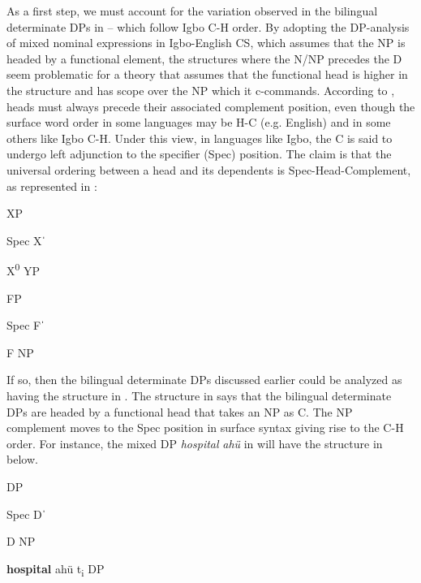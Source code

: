 \documentclass[output=paper]{langsci/langscibook}
\begin{document}
As a first step, we must account for the variation observed in the bilingual determinate DPs in -- which follow Igbo C-H order. By adopting the DP-analysis of mixed nominal expressions in Igbo-English CS, which assumes that the NP is headed by a functional element, the structures where the N/NP precedes the D seem problematic for a theory that assumes that the functional head is higher in the structure and has scope over the NP which it c-commands. According to \citet{Kayne1994}, heads must always precede their associated complement position, even though the surface word order in some languages may be H-C (e.g. English) and in some others like Igbo C-H. Under this view, in languages like Igbo, the C is said to undergo left adjunction to the specifier (Spec) position. The claim is that the universal ordering between a head and its dependents is Spec-Head-Complement, as represented in :

\ea\label{ex:ihemere:14}
    
 

	      XP          

Spec    Xˈ     

      X\textsuperscript{0}    YP       
\z

\ea\label{ex:ihemere:15}
		FP
        
     Spec    Fˈ
     
     F    NP 
\z 
{}

If so, then the bilingual determinate DPs discussed earlier could be analyzed as having the structure in . The structure in  says that the bilingual determinate DPs are headed by a functional head that takes an NP as C. The NP complement moves to the Spec position in surface syntax giving rise to the C-H order. For instance, the mixed DP \textit{hospital}\textbf{\textit{}} \textit{ahü} in  will have the structure in  below.

\ea\label{ex:ihemere:16} 

	    DP                                                  

  Spec       Dˈ                                                 

      D    NP                                                   
 

         \textbf{hospital}            ahü     t\textsubscript{i}
\z
{}
\ea\label{ex:ihemere:17}    DP
\end{document}
